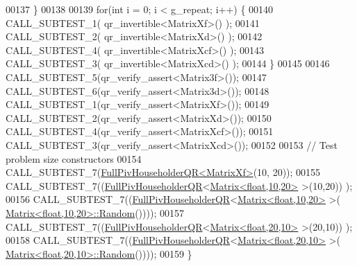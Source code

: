 \begin{DoxyCode}
00137   \}
00138 
00139   \textcolor{keywordflow}{for}(\textcolor{keywordtype}{int} i = 0; i < g\_repeat; i++) \{
00140     CALL\_SUBTEST\_1( qr\_invertible<MatrixXf>() );
00141     CALL\_SUBTEST\_2( qr\_invertible<MatrixXd>() );
00142     CALL\_SUBTEST\_4( qr\_invertible<MatrixXcf>() );
00143     CALL\_SUBTEST\_3( qr\_invertible<MatrixXcd>() );
00144   \}
00145 
00146   CALL\_SUBTEST\_5(qr\_verify\_assert<Matrix3f>());
00147   CALL\_SUBTEST\_6(qr\_verify\_assert<Matrix3d>());
00148   CALL\_SUBTEST\_1(qr\_verify\_assert<MatrixXf>());
00149   CALL\_SUBTEST\_2(qr\_verify\_assert<MatrixXd>());
00150   CALL\_SUBTEST\_4(qr\_verify\_assert<MatrixXcf>());
00151   CALL\_SUBTEST\_3(qr\_verify\_assert<MatrixXcd>());
00152 
00153   \textcolor{comment}{// Test problem size constructors}
00154   CALL\_SUBTEST\_7(\hyperlink{group___q_r___module_class_eigen_1_1_full_piv_householder_q_r}{FullPivHouseholderQR<MatrixXf>}(10, 20));
00155   CALL\_SUBTEST\_7((\hyperlink{group___q_r___module_class_eigen_1_1_full_piv_householder_q_r}{FullPivHouseholderQR}<\hyperlink{group___core___module_class_eigen_1_1_matrix}{Matrix<float,10,20>} >(10,20))
      );
00156   CALL\_SUBTEST\_7((\hyperlink{group___q_r___module_class_eigen_1_1_full_piv_householder_q_r}{FullPivHouseholderQR}<\hyperlink{group___core___module_class_eigen_1_1_matrix}{Matrix<float,10,20>} >(
      \hyperlink{group___core___module_class_eigen_1_1_matrix}{Matrix<float,10,20>::Random}())));
00157   CALL\_SUBTEST\_7((\hyperlink{group___q_r___module_class_eigen_1_1_full_piv_householder_q_r}{FullPivHouseholderQR}<\hyperlink{group___core___module_class_eigen_1_1_matrix}{Matrix<float,20,10>} >(20,10))
      );
00158   CALL\_SUBTEST\_7((\hyperlink{group___q_r___module_class_eigen_1_1_full_piv_householder_q_r}{FullPivHouseholderQR}<\hyperlink{group___core___module_class_eigen_1_1_matrix}{Matrix<float,20,10>} >(
      \hyperlink{group___core___module_class_eigen_1_1_matrix}{Matrix<float,20,10>::Random}())));
00159 \}
\end{DoxyCode}
